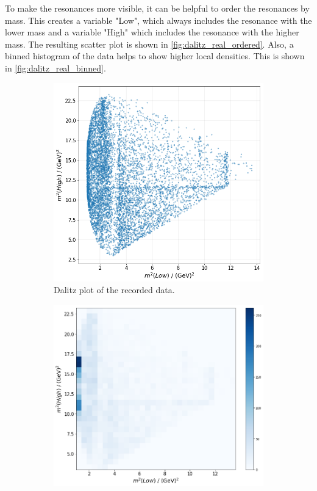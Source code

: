 To make the resonances more visible, it can be helpful to order the resonances by mass. This creates a variable "Low", which always includes the resonance with the lower mass and a variable "High" which includes the resonance
with the higher mass. The resulting scatter plot is shown in \autoref{fig:dalitz_real_ordered}. Also, a binned histogram of the data helps to show higher local densities. This is shown in \autoref{fig:dalitz_real_binned}.
\begin{figure}
  \centering
  \begin{subfigure}[b]{0.45\textwidth}
      \centering
      \includegraphics[width=\textwidth]{"content/pics/dalitz_real_ordered.png"}
      \caption{Dalitz plot of the recorded data.}
      \label{fig:dalitz_real_ordered}
  \end{subfigure}
  \hfill
  \begin{subfigure}[b]{0.45\textwidth}
      \centering
      \includegraphics[width=\textwidth]{"content/pics/dalitz_real_ordered_binned.png"}

\end{subfigure}
\end{figure}
